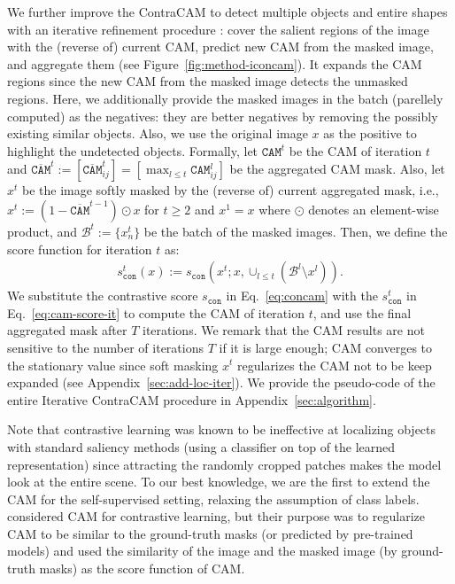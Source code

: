 \documentclass{article}
\begin{document}



We further improve the ContraCAM to detect multiple objects and entire shapes with an iterative refinement procedure \citep{wei2017object}: cover the salient regions of the image with the (reverse of) current CAM, predict new CAM from the masked image, and aggregate them (see Figure~\ref{fig:method-iconcam}). It expands the CAM regions since the new CAM from the masked image detects the unmasked regions. Here, we additionally provide the masked images in the batch (parellely computed) as the negatives: they are better negatives by removing the possibly existing similar objects. Also, we use the original image $x$ as the positive to highlight the undetected objects. Formally, let $\texttt{CAM}^t$ be the CAM of iteration $t$ and $\overline{\texttt{CAM}}^t := [\overline{\texttt{CAM}}^t_{ij}] = [\max_{l \le t} \texttt{CAM}^l_{ij}]$ be the aggregated CAM mask. Also, let $x^t$ be the image softly masked by the (reverse of) current aggregated mask, i.e., $x^t := (1 - \overline{\texttt{CAM}}^{t-1}) \odot x$ for $t \ge 2$ and $x^1 = x$ where $\odot$ denotes an element-wise product, and $\mathcal{B}^t := \{x^t_n\}$ be the batch of the masked images. Then, we define the score function for iteration $t$ as:
\begin{align}
s_\texttt{con}^t(x) := s_\texttt{con}(x^t; x, \cup_{l \le t} (\mathcal{B}^l \setminus x^l)).
\label{eq:cam-score-it}
\end{align}
We substitute the contrastive score $s_\texttt{con}$ in Eq.~\eqref{eq:concam} with the $s_\texttt{con}^t$ in Eq.~\eqref{eq:cam-score-it} to compute the CAM of iteration $t$, and use the final aggregated mask after $T$ iterations. We remark that the CAM results are not sensitive to the number of iterations $T$ if it is large enough; CAM converges to the stationary value since soft masking $x^t$ regularizes the CAM not to be keep expanded (see Appendix~\ref{sec:add-loc-iter}). We provide the pseudo-code of the entire Iterative ContraCAM procedure in Appendix~\ref{sec:algorithm}.

Note that contrastive learning was known to be ineffective at localizing objects \citep{zhao2021distilling} with standard saliency methods (using a classifier on top of the learned representation) since attracting the randomly cropped patches makes the model look at the entire scene. To our best knowledge, we are the first to extend the CAM for the self-supervised setting, relaxing the assumption of class labels. \citet{selvaraju2021casting} considered CAM for contrastive learning, but their purpose was to regularize CAM to be similar to the ground-truth masks (or predicted by pre-trained models) and used the similarity of the image and the masked image (by ground-truth masks) as the score function of CAM.
\end{document}
